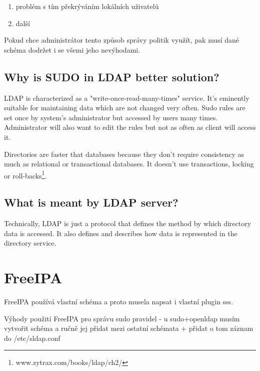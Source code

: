 \documentclass[10pt,a4paper,notitlepage]{article}
\begin{document}
\begin{enumerate} 
	\item problém s	tím překrýváním lokálních uživatelů 
	\item další
\end{enumerate}

Pokud chce administrátor tento způsob správy politik využít, pak musí dané
schéma dodržet i se všemi jeho nevýhodami.

\subsection{Why is SUDO in LDAP better solution?}
LDAP is characterized as a "write-once-read-many-times" service. It's eminently
suitable for maintaining data which are not changed very often. Sudo rules are
set once by system's administrator but accessed by users many times.
Administrator will also want to edit the rules but not as often as client will
access it.

Directories are faster that databases because they don't require consistency as
much as relational or transactional databases. It doesn't use transactions,
locking or roll-backs\footnote{www.zytrax.com/books/ldap/ch2/}.


\subsection{What is meant by LDAP server?}
Technically, LDAP is just a protocol that defines the method by which directory
data is accessed. It also defines and describes how data is represented in the
directory service.


\section{FreeIPA}
FreeIPA používá vlastní schéma a proto musela napsat i vlastní plugin sss.

Výhody použití FreeIPA pro správu sudo pravidel - u sudo+openldap musím vytvořit
schéma a ručně jej přidat mezi ostatní schémata + přidat o tom záznam do
/etc/sldap.conf
\end{document}
